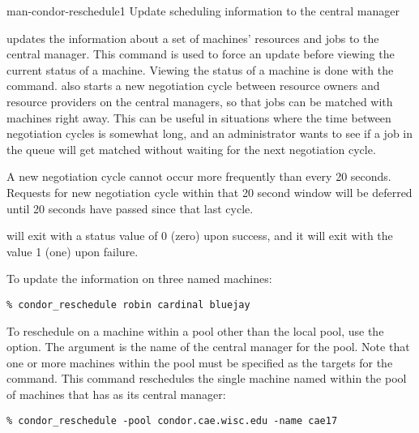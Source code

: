 \begin{ManPage}{}{man-condor-reschedule}{1}
{Update scheduling information to the central manager}


\Synopsis {}
\ToolArgsBase

\ToolDebugOption
\ToolWhere

\Description 

 updates the information about a set of machines' resources
and jobs to the central manager.
This command is used to force an update before viewing the
current status of a machine.
Viewing the status of a machine is done with 
the  command.
 also
starts a new negotiation cycle between resource owners and resource providers
on the central managers, so that jobs can be matched with machines right
away.
This can be useful in situations where the time between negotiation
cycles is somewhat long, and an administrator wants to see if a job 
in the queue will get matched without waiting for the next negotiation cycle.

A new negotiation cycle cannot occur more frequently than
every 20 seconds.
Requests for new negotiation cycle within that
20 second window will be deferred until 20 seconds have passed
since that last cycle.

\begin{Options}
	\ToolArgsBaseDesc
	\ToolDebugDesc
	\ToolArgsLocateDesc
\end{Options}

\ExitStatus

 will exit with a status value of 0 (zero) upon success,
and it will exit with the value 1 (one) upon failure.

\Examples

To update the information on three named machines:
\begin{verbatim}
% condor_reschedule robin cardinal bluejay
\end{verbatim}

To reschedule on a machine within a pool
other than the local pool, use the  option.
The argument is the name of the central manager for the pool.
Note that one or more machines within the pool must be
specified as the targets for the command.
This command reschedules 
the single machine named  within the
pool of machines that has  as
its central manager:
\begin{verbatim}
% condor_reschedule -pool condor.cae.wisc.edu -name cae17
\end{verbatim}

\end{ManPage}
